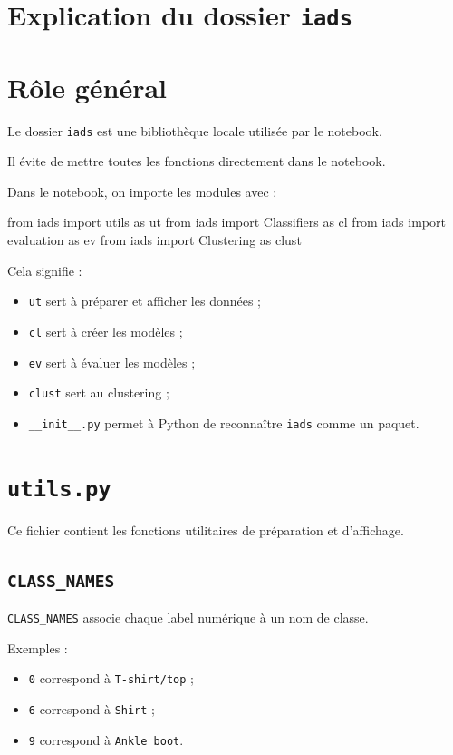 \documentclass[11pt,a4paper]{article}
\begin{document}
\section{Explication du dossier \texttt{iads}}

\section{Rôle général}

Le dossier \texttt{iads} est une bibliothèque locale utilisée par le notebook.

Il évite de mettre toutes les fonctions directement dans le notebook.

Dans le notebook, on importe les modules avec :

\begin{codeblock}
from iads import utils as ut
from iads import Classifiers as cl
from iads import evaluation as ev
from iads import Clustering as clust
\end{codeblock}

Cela signifie :

\begin{itemize}
\item \texttt{ut} sert à préparer et afficher les données ;
\item \texttt{cl} sert à créer les modèles ;
\item \texttt{ev} sert à évaluer les modèles ;
\item \texttt{clust} sert au clustering ;
\item \texttt{\_\_init\_\_.py} permet à Python de reconnaître \texttt{iads} comme un paquet.
\end{itemize}

\section{\texttt{utils.py}}

Ce fichier contient les fonctions utilitaires de préparation et d'affichage.

\subsection{\texttt{CLASS\_NAMES}}

\texttt{CLASS\_NAMES} associe chaque label numérique à un nom de classe.

Exemples :

\begin{itemize}
\item \texttt{0} correspond à \texttt{T-shirt/top} ;
\item \texttt{6} correspond à \texttt{Shirt} ;
\item \texttt{9} correspond à \texttt{Ankle boot}.
\end{itemize}
\end{document}
